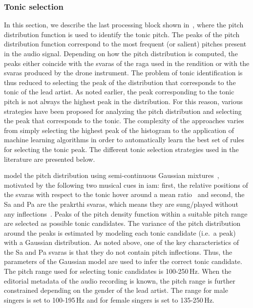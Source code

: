 \subsubsection{Tonic selection}
\label{sec:tonic_selection}

In this section, we describe the last processing block shown in~, where the pitch distribution function is used to identify the tonic pitch. The peaks of the pitch distribution function correspond to the most frequent (or salient) pitches present in the audio signal. Depending on how the pitch distribution is computed, the peaks either coincide with the \glspl{svara} of the \gls{raga} used in the rendition or with the \glspl{svara} produced by the drone instrument. The problem of tonic identification is thus reduced to selecting the peak of the distribution that corresponds to the tonic of the lead artist. As noted earlier, the peak corresponding to the tonic pitch is not always the highest peak in the distribution. For this reason, various strategies have been proposed for analyzing the pitch distribution and selecting the peak that corresponds to the tonic. The complexity of the approaches varies from simply selecting the highest peak of the histogram to the application of machine learning algorithms in order to automatically learn the best set of rules for selecting the tonic peak. The different tonic selection strategies used in the literature are presented below.

\cite{ranjani2011carnatic} model the pitch distribution using semi-continuous Gaussian mixtures~\citep{Huang2001}, motivated by the following two musical cues in \gls{iam}: first, the relative positions of the \glspl{svara} with respect to the tonic hover around a mean ratio~\citep{Krishnaswamy2003} and second, the Sa and Pa are the prakrthi \glspl{svara}, which means they are sung/played without any inflections~\citep{Manikandan2004,Krishnaswamyicassp2003}. Peaks of the pitch density function within a suitable pitch range are selected as possible tonic candidates. The variance of the pitch distribution around the peaks is estimated by modeling each tonic candidate (i.e.~a peak) with a Gaussian distribution. As noted above, one of the key characteristics of the Sa and Pa \glspl{svara} is that they do not contain pitch inflections. Thus, the parameters of the Gaussian model are used to infer the correct tonic candidate. The pitch range used for selecting tonic candidates is 100-250\,Hz. When the editorial metadata of the audio recording is known, the pitch range is further constrained depending on the gender of the lead artist. The range for male singers is set to 100-195\,Hz and for female singers is set to 135-250\,Hz.

